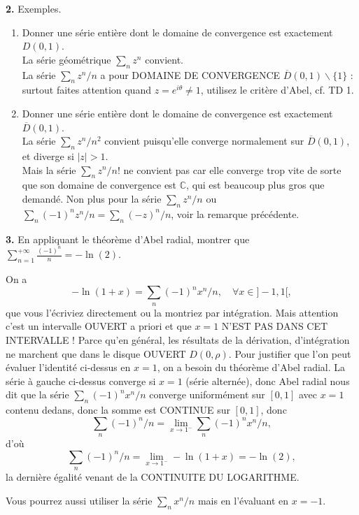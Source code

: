 \documentclass[a4paper,10pt]{article}
\newcommand{\C}{\mathbb{C}}
\newcommand{\abs}[1]{\left|#1\right|}
\newcommand{\correction}[1]{{\color{red}#1}}
\newcommand{\comment}[1]{{\color{blue}#1}}
\begin{document}
\vspace{.1in}
\noindent
\textbf{2.} Exemples.
\begin{enumerate}[label=\alph*)]
    \item Donner une série entière dont le domaine de convergence est exactement $D(0,1)$.\\
    \correction{La série géométrique $\sum_n z^n$ convient.}\\
    \comment{La série $\sum_n z^n/n$ a pour DOMAINE DE CONVERGENCE $\overline{D}(0,1)\backslash\{1\}$ : surtout faites attention quand $z=e^{i\theta}\neq 1$, utilisez le critère d'Abel, cf. TD 1.}
    \item Donner une série entière dont le domaine de convergence est exactement $\overline{D}(0,1)$.\\
    \correction{La série $\sum_nz^n/n^2$ convient puisqu'elle converge normalement sur $\overline{D}(0,1)$, et diverge si $\abs{z}>1$.}\\
    \comment{Mais la série $\sum_nz^n/n!$ ne convient pas car elle converge trop vite de sorte que son domaine de convergence est $\C$, qui est beaucoup plus gros que demandé. Non plus pour la série $\sum_nz^n/n$ ou $\sum_n(-1)^nz^n/n=\sum_n(-z)^n/n$, voir la remarque précédente.}
\end{enumerate}

\vspace{.1in}
\noindent
\textbf{3.}
En appliquant le théorème d'Abel radial,
montrer que $\sum_{n=1}^{+\infty} \frac{(-1)^n}{n}=-\ln(2)$.

\correction{On a 
$$-\ln(1+x)=\sum_n (-1)^nx^n/n,\quad \forall x\in]-1,1[,$$
que vous l'écriviez directement ou la montriez par intégration.}
\comment{Mais attention c'est un intervalle OUVERT a priori et que $x=1$ N'EST PAS DANS CET INTERVALLE ! Parce qu'en général, les résultats de la dérivation, d'intégration ne marchent que dans le disque OUVERT $D(0,\rho)$. Pour justifier que l'on peut évaluer l'identité ci-dessus en $x=1$, on a besoin du théorème d'Abel radial.}
\correction{La série à gauche ci-dessus converge si $x=1$ (série alternée), donc Abel radial nous dit que la série  $\sum_n(-1)^nx^n/n$ converge uniformément sur $[0,1]$ avec $x=1$ contenu dedans, donc la somme est CONTINUE sur $[0,1]$, donc
$$\sum_n(-1)^n/n=\lim_{x\to 1^-}\sum_n(-1)^nx^n/n,$$
d'où
$$\sum_n(-1)^n/n=\lim_{x\to1^-}-\ln(1+x)=-\ln(2),$$
la dernière égalité venant de la CONTINUITE DU LOGARITHME.
}

\comment{Vous pourrez aussi utiliser la série $\sum_n x^n/n$ mais en l'évaluant en $x=-1$.}
\end{document}
